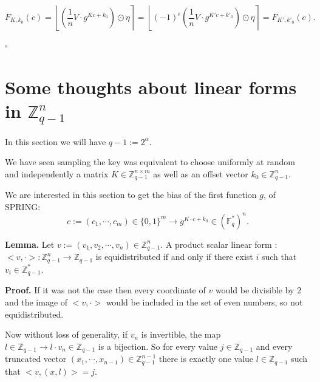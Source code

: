 \documentclass{article}
\begin{document}
\[
F_{K,k_0}(c)
=
\left\lfloor
\left(
\frac{1}{n} V \cdot g^{Kc + k_0}
\right)
\odot \eta
\right\rceil = \left\lfloor
(-1)^\epsilon\left(
\frac{1}{n} V \cdot g^{K'c + k'_0}
\right)
\odot \eta
\right\rceil = F_{K',k'_0}(c).
\]

\hfill $\square$

\vspace{0.3cm}

\section{Some thoughts about linear forms in $\mathbb{Z}_{q-1}^n$}

In this section we will have $q-1:= 2^{\alpha}$.

\vspace{0.3cm}

We have seen sampling the key was equivalent to choose uniformly at random and independently a matrix $K \in \mathbb{Z}_{q-1}^{n \times m}$ as well as an offset vector $k_0 \in \mathbb{Z}_{q-1}^n$.

\vspace{0.3cm}

We are interested in this section to get the bias of the first function $g$, of SPRING:
\[
 c:=(c_1,\cdots,c_m) \in \{0,1\}^m \to g^{K \cdot c + k_0} \in (\mathbb{F}_q^*)^n.
\]

\vspace{0.3cm}

\textbf{Lemma.}
Let $v:=(v_1,v_2,\cdots,v_n)\in \mathbb{Z}_{q-1}^n$.
A product scalar linear form : $<v, \cdot >: \mathbb{Z}_{q-1}^n \to \mathbb{Z}_{q-1}$ is equidistributed if and only if there exist $i$ such that $v_i \in \mathbb{Z}_{q-1}^*$.

\vspace{0.3cm}

\textbf{Proof.}
If it was not the case then every coordinate of $v$ would be divisible by 2 and the image of $<v,\cdot>$ would be included in the set of even numbers, so not equidistributed.

\vspace{0.3cm}

Now without loss of generality, if $v_n$ is invertible, the map $l \in \mathbb{Z}_{q-1} \to l\cdot v_n \in \mathbb{Z}_{q-1}$ is a bijection. So  for every value $j \in \mathbb{Z}_{q-1}$ and every truncated vector $(x_1,\cdots,x_{n-1}) \in  \mathbb{Z}_{q-1}^{n-1} $ there is exactly one value $l \in \mathbb{Z}_{q-1}$ such that $<v, (x,l)> = j$. 
\end{document}
